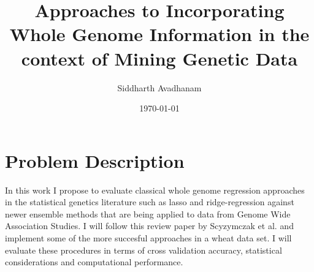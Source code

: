 \documentclass{sig-alternate-05-2015}
\begin{document}


\title{Approaches to Incorporating Whole Genome Information in the context of Mining Genetic Data}

\author{
%
%
Siddharth Avadhanam\\
}
\date{\today}

\maketitle



\section{Problem Description}
In this work I propose to evaluate classical whole genome regression approaches in the statistical genetics literature such as lasso and
ridge-regression against newer ensemble methods that are being applied to data from Genome Wide Association Studies.
I will follow this review paper by Scyzymczak et al. \cite{Szymczak_machine_2009} and implement some of the more succesful approaches in a wheat data set.
I will evaluate these procedures in terms of cross validation accuracy, statistical considerations and computational performance.
\end{document}

